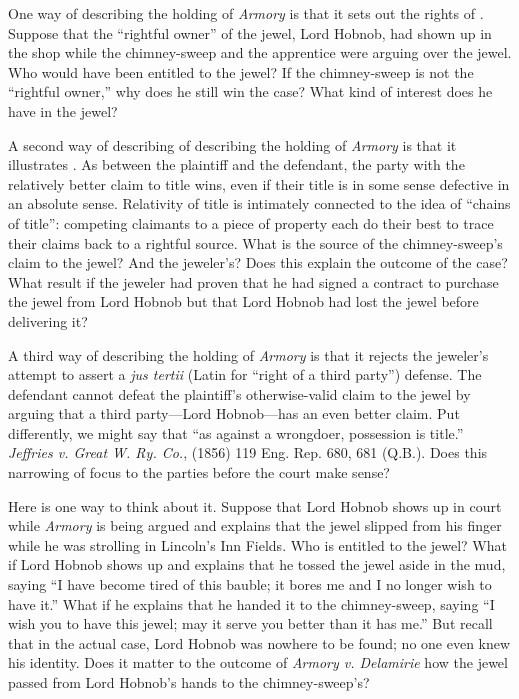 
\item One way of describing the holding of \textit{Armory} is that it sets out
the rights of . Suppose that the ``rightful owner'' of the
jewel, Lord
Hobnob, had shown up in the shop while the chimney-sweep and the apprentice
were arguing over the jewel. Who would have been entitled to the jewel? If the
chimney-sweep is not the ``rightful owner,'' why does he still win the case?
What kind of interest does he have in the jewel?

\item A second way of describing of describing the holding of \textit{Armory} is
that it illustrates . As between the plaintiff and the
defendant, the party with the relatively better claim to title wins, even if
their title is in some sense defective in an absolute sense. Relativity of
title is intimately connected to the idea of ``chains of title'': competing
claimants to a piece of property each do their best to trace their claims back
to a rightful source. What is the source of the chimney-sweep's claim to the
jewel? And the jeweler's? Does this explain the outcome of the case? What
result if the jeweler had proven that he had signed a contract to purchase the
jewel from Lord Hobnob but that Lord Hobnob had lost the jewel before
delivering it?

\item A third way of describing the holding of \textit{Armory} is that it
rejects the jeweler's attempt to assert a \textit{jus tertii} (Latin for
``right of a third party'') defense. The defendant cannot defeat the
plaintiff's otherwise-valid claim to the jewel by arguing that a third
party---Lord Hobnob---has an even better claim. Put differently, we might say
that
``as against a wrongdoer, possession is title.'' \textit{Jeffries v. Great W.
Ry. Co.}, (1856) 119 Eng. Rep. 680, 681 (Q.B.). Does this narrowing of focus to
the parties before the court make sense? 

Here is one way to think about it. Suppose that Lord Hobnob shows up in court
while \textit{Armory} is being argued and explains that the jewel slipped from
his finger while he was strolling in Lincoln's Inn Fields. Who is entitled to
the jewel? What if Lord Hobnob shows up and explains that he tossed the jewel
aside in the mud, saying ``I have become tired of this bauble; it bores me and
I no longer wish to have it.'' What if he explains that he handed it to the
chimney-sweep, saying ``I wish you to have this jewel; may it serve you better
than it has me.'' But recall that in the actual case, Lord Hobnob was nowhere
to be found; no one even knew his identity. Does it matter to the outcome of
\textit{Armory v. Delamirie} how the jewel passed from Lord Hobnob's hands to
the chimney-sweep's? 

